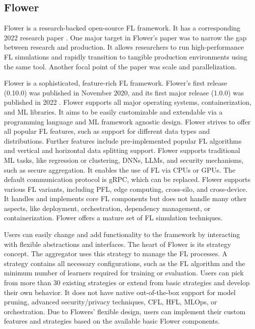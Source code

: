\subsection{Flower}

Flower is a research-backed open-source FL framework.
It has a corresponding 2022 research paper \cite{paper:flower}.
One major target in Flower's paper was to narrow the gap between research and production.
It allows researchers to run high-performance FL simulations and rapidly transition to tangible production environments using the same tool.
Another focal point of the paper was scale and parallelization.

Flower is a sophisticated, feature-rich FL framework.
Flower's first release (0.10.0) was published in November 2020, and its first major release (1.0.0) was published in 2022 \cite{fl_framework:flower}.
Flower supports all major operating systems, containerization, and ML libraries.
It aims to be easily customizable and extendable via a programming language and ML framework agnostic design.
Flower strives to offer all popular FL features, such as support for different data types and distributions.
Further features include pre-implemented popular FL algorithms and vertical and horizontal data splitting support.
Flower supports traditional ML tasks, like regression or clustering, DNNs, LLMs, and security mechanisms, such as secure aggregation.
It enables the use of FL via CPUs or GPUs.
The default communication protocol is gRPC, which can be replaced.
Flower supports various FL variants, including PFL, edge computing, cross-silo, and cross-device.
It handles and implements core FL components but does not handle many other aspects, like deployment, orchestration, dependency management, or containerization.
Flower offers a mature set of FL simulation techniques.

Users can easily change and add functionality to the framework by interacting with flexible abstractions and interfaces.
The heart of Flower is its strategy concept.
The aggregator uses this strategy to manage the FL processes.
A strategy contains all necessary configurations, such as the FL algorithm and the minimum number of learners required for training or evaluation.
Users can pick from more than 30 existing strategies \cite{flower:strategies} or extend from basic strategies and develop their own behavior.
It does not have native out-of-the-box support for model pruning, advanced security/privacy techniques, CFL, HFL, MLOps, or orchestration.
Due to Flowers' flexible design, users can implement their custom features and strategies based on the available basic Flower components.

